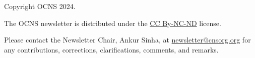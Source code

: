 \documentclass[11pt,a4paper,oneside]{article}
\begin{document}
\clearpage

\vspace*{\fill}
\begin{center}
  \begin{minipage}{\textwidth}
    \begin{center}
      Copyright \textcopyright{} OCNS 2024.\\\vspace{2ex}

      The OCNS newsletter is distributed under the \href{https://creativecommons.org/licenses/by-nc-nd/4.0/}{CC By-NC-ND} license.\\\vspace{2ex}

      Please contact the Newsletter Chair, Ankur Sinha, at \href{mailto:newsletter@cnsorg.org}{newsletter@cnsorg.org} for any contributions, corrections, clarifications, comments, and remarks.
    \end{center}
  \end{minipage}
\end{center}
\vfill
\clearpage
\end{document}
